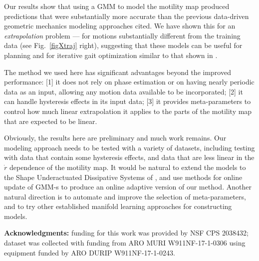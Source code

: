 \documentclass[conference]{IEEEtran}
\begin{document}
Our results show that using a GMM to model the motility map produced predictions that were substantially more accurate than the previous data-driven geometric mechanics modeling approaches cited.
We have shown this for an \emph{extrapolation} problem --- for motions substantially different from the training data (see Fig.~\ref{figXtraj} right), suggesting that these models can be useful for planning and for iterative gait optimization similar to that shown in .

The method we used here has significant advantages beyond the improved performance: 
[1] it does not rely on phase estimation or on having nearly periodic data as an input, allowing any motion data available to be incorporated;
[2] it can handle hysteresis effects in its input data;
[3] it provides meta-parameters to control how much linear extrapolation it applies to the parts of the motility map that are expected to be linear.

Obviously, the results here are preliminary and much work remains.
Our modeling approach needs to be tested with a variety of datasets, including testing with data that contain some hysteresis effects, and data that are less linear in the $\dot r$ dependence of the motility map.
It would be natural to extend the models to the Shape Underactuated Dissipative Systems of ,
and use methods for online update of GMM-s to produce an online adaptive version of our method.
Another natural direction is to automate and improve the selection of meta-parameters, and to try other established manifold learning approaches for constructing models.

\textbf{Acknowledgments:} funding for this work was provided by NSF CPS 2038432; dataset was collected with funding from ARO MURI W911NF-17-1-0306 using equipment funded by ARO DURIP W911NF-17-1-0243.  

\printbibliography
\end{document}
